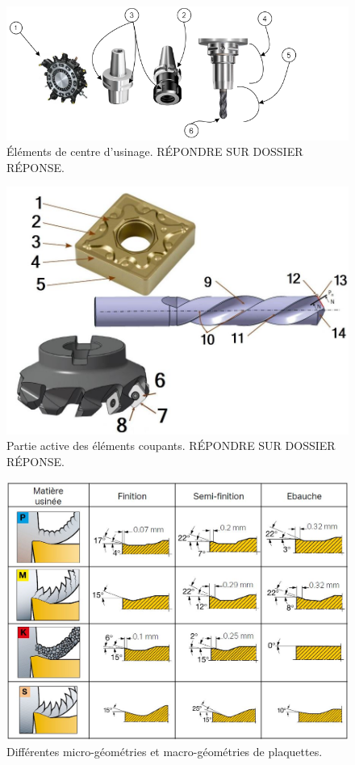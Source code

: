\documentclass[12pt]{article}
\begin{document}
\begin{figure}
\centering
\includegraphics[width=1\linewidth]{Images/FF1.png}
\caption{Éléments de centre d'usinage. RÉPONDRE SUR DOSSIER RÉPONSE.}
\label{FF1}
\end{figure}




\begin{figure}
\centering
\includegraphics[width=1.1\linewidth]{Images/PLA20.JPG}
\caption{Partie active des éléments coupants. RÉPONDRE SUR DOSSIER RÉPONSE.}
\label{PLA20}
\end{figure}


\begin{figure}
\centering
\includegraphics[width=1.1\linewidth]{Images/PLA21.JPG}
\caption{Différentes micro-géométries et macro-géométries de plaquettes.}
\label{PLA21}
\end{figure}
\end{document}
